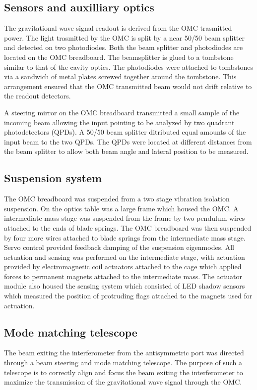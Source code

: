 \subsection{Sensors and auxilliary optics}
The gravitational wave signal readout is derived from the OMC trasmitted power. %
The light trasmitted by the OMC is split by a near 50/50 beam splitter and detected on two photodiodes. %
Both the beam splitter and photodiodes are located on the OMC breadboard. %
The beamsplitter is glued to a tombstone similar to that of the cavity optics. %
The photodiodes were attached to tombstones via a sandwich of metal plates screwed together around the tombstone. %
This arrangement ensured that the OMC transmitted beam would not drift relative to the readout detectors.

A steering mirror on the OMC breadboard transmitted a small sample of the incoming beam allowing the input pointing to be analyzed by two quadrant photodetectors (QPDs). %
A 50/50 beam splitter ditributed equal amounts of the input beam to the two QPDs. %
The QPDs were located at different distances from the beam splitter to allow both beam angle and lateral position to be measured.

\subsection{Suspension system}
The OMC breadboard was suspended from a two stage vibration isolation suspension. %
On the optics table was a large  frame which housed the OMC. %
A intermediate mass stage was suspended from the frame by two pendulum wires attached to the ends of blade springs. %
The OMC breadboard was then suspended by four more wires attached to blade springs from the intermediate mass stage. %
Servo control provided feedback damping of the suspension eigenmodes. %
All actuation and sensing was performed on the intermediate stage, with actuation provided by electromagnetic coil actuators attached to the cage which applied forces to permanent magnets attached to the intermediate mass. %
The actuator module also housed the sensing system which consisted of LED shadow sensors which measured the position of protruding flags attached to the magnets used for actuation.

\subsection{Mode matching telescope}
The beam exiting the interferometer from the antisymmetric port was directed through a beam steering and mode matching telescope. %
The purpose of such a telescope is to correctly align and focus the beam exiting the interferometer to maximize the transmission of the gravitational wave signal through the OMC.

